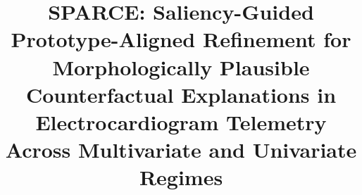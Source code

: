 \documentclass[conference]{IEEEtran}
\begin{document}
\title{SPARCE: Saliency-Guided Prototype-Aligned Refinement for Morphologically Plausible Counterfactual Explanations in Electrocardiogram Telemetry Across Multivariate and Univariate Regimes}

\author{
}

\maketitle
\end{document}
